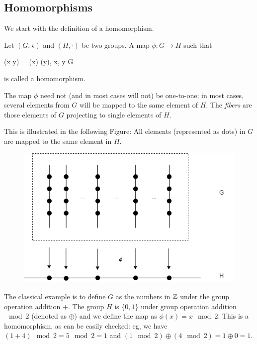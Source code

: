 
\subsection{Homomorphisms}

We start with the definition of a homomorphism.

\begin{definition}
Let $(G,\star)$ and $(H,\cdot)$ be two groups. A map $\phi: G \rightarrow H$ such that

\bee
\phi(x \star y) = \phi(x) \cdot \phi(y), \quad \forall x, y \in G
\eee

is called a homomorphism.

\end{definition}

The map $\phi$ need not (and in most cases will not) be one-to-one; in most cases, several elements from $G$ will be mapped to the same element of $H$. The \emph{fibers} are those elements of $G$ projecting to single elements of $H$.

This is illustrated in the following Figure: All elements (represented as dots) in $G$ are mapped to the same element in $H$.

\begin{figure}[H]
\centering
\includegraphics[scale=0.55]{images/2023-07-17-homomorphism.png}
\end{figure}

The classical example is to define $G$ as the numbers in $\mathbb{Z}$ under the group operation addition $+$. The group $H$ is $\{0, 1\}$ under group operation addition $\mod 2$ (denoted as $\oplus$) and we define the map as $\phi(x) = x \mod 2$. This is a homomorphism, as can be easily checked: eg, we have $(1 + 4) \mod 2 = 5 \mod 2 = 1$ and $(1 \mod 2) \oplus (4 \mod 2) = 1 \oplus 0 = 1$.

